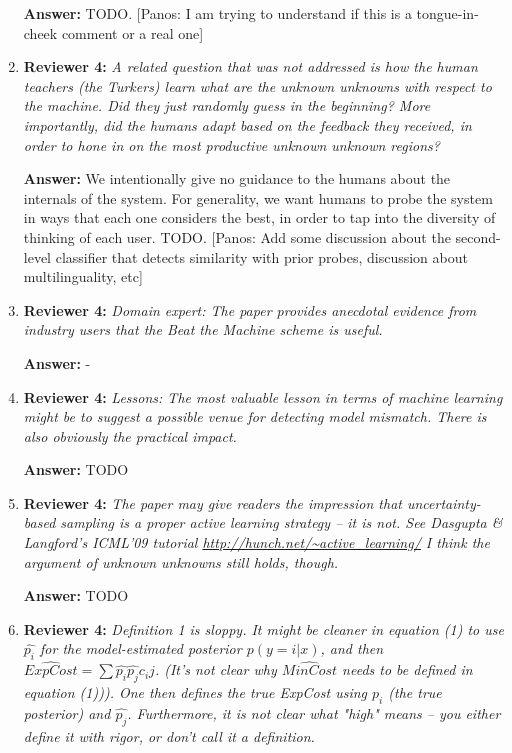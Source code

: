 \documentclass[letterpaper]{article}
\begin{document}
\begin{enumerate}
\textbf{Answer:} TODO. [Panos: I am trying to understand if this is a tongue-in-cheek comment or a real one]

\item \textbf{Reviewer 4:} \emph{ A related question that was not addressed is how the human teachers (the Turkers) learn what are the unknown unknowns with respect to the machine.  Did they just randomly guess in the beginning?  More importantly, did the humans adapt based on the feedback they received, in order to hone in on the most productive unknown unknown regions?}

\textbf{Answer:} We intentionally give no guidance to the humans about the internals of the system. For generality, we want humans to probe the system in ways that each one considers the best, in order to tap into the diversity of thinking of each user. TODO. [Panos: Add some discussion about the second-level classifier that detects similarity with prior probes, discussion about multilinguality, etc]

\item \textbf{Reviewer 4:} \emph{ Domain expert: The paper provides anecdotal evidence from industry users that the Beat the Machine scheme is useful.}

\textbf{Answer:} -

\item \textbf{Reviewer 4:} \emph{ Lessons: The most valuable lesson in terms of machine learning might be to suggest a possible venue for detecting model mismatch.  There is also obviously the practical impact.}

\textbf{Answer:} TODO

\item \textbf{Reviewer 4:} \emph{ The paper may give readers the impression that uncertainty-based sampling is a proper active learning strategy -- it is not.  See Dasgupta \& Langford's ICML'09 tutorial  \url{http://hunch.net/~active_learning/} I think the argument of unknown unknowns still holds, though.}

\textbf{Answer:} TODO

\item \textbf{Reviewer 4:} \emph{ Definition 1 is sloppy.  It might be cleaner in equation (1) to use $\hat{p_i}$ for the model-estimated posterior $p(y=i | x)$, and then $\hat{ExpCost}=\sum \hat{p_i} \hat{p_j} c_ij$.  (It's not clear why $\hat{MinCost}$ needs to be defined in equation (1))).  One then defines the true ExpCost using $p_i$ (the true posterior) and $\hat{p_j}$.  Furthermore, it is not clear what "high" means -- you either define it with rigor, or don't call it a definition.}


\end{enumerate}
\end{document}
